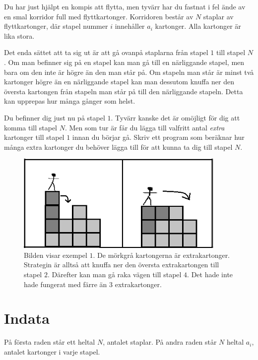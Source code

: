 

Du har just hjälpt en kompis att flytta, men tyvärr har du fastnat i
fel ände av en smal korridor full med flyttkartonger. Korridoren
består av $N$ staplar av flyttkartonger, där stapel nummer $i$
innehåller $a_i$ kartonger. Alla kartonger är lika stora.

Det enda sättet att ta sig ut är att gå ovanpå staplarna från stapel
$1$ till stapel $N$. Om man befinner sig på en stapel kan man gå till
en närliggande stapel, men bara om den inte är högre än den man står
på. Om stapeln man står är minst två kartonger högre än en närliggande
stapel kan man dessutom knuffa ner den översta kartongen från stapeln
man står på till den närliggande stapeln. Detta kan upprepas hur många
gånger som helst. 

Du befinner dig just nu på stapel $1$. Tyvärr kanske det är omöjligt
för dig att komma till stapel $N$. Men som tur är får du lägga till
valfritt antal {\em extra} kartonger till stapel $1$ innan du börjar gå. Skriv ett program som
beräknar hur många extra kartonger du behöver lägga till för att kunna
ta dig till stapel $N$.

\begin{figure}[!h]
\begin{center}
\includegraphics[width=0.9\textwidth]{kartongbild2.png}
\end{center}
\caption{Bilden visar exempel $1$. De mörkgrå kartongerna är extrakartonger. Strategin är alltså att knuffa ner den översta extrakartongen till stapel $2$. Därefter kan man gå raka vägen till stapel $4$. Det hade inte hade fungerat med färre än $3$ extrakartonger.}
\end{figure}

\section*{Indata}
På första raden står ett heltal $N$, antalet staplar. På andra raden står $N$ heltal $a_i$, antalet kartonger i varje stapel. 

